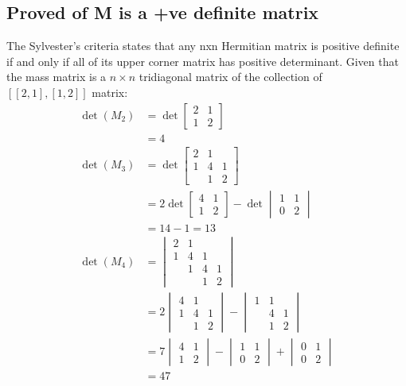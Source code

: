 \documentclass{article}
\begin{document}
\subsection{Proved of M is a +ve definite matrix}%
\label{sub:Proved of M is a +ve definite matrix}
The Sylvester's criteria states that any nxn Hermitian matrix is positive definite if and only if all of its upper corner matrix has positive determinant. Given that the mass matrix is a $n \times n$ tridiagonal matrix of the collection of $[[2, 1], [1, 2]]$ matrix:
\begin{align}
  \det(M_2) &= \det \begin{bmatrix}
    2 & 1 \\
    1 & 2
  \end{bmatrix} \\
   &= 4 \\
    \det(M_3) &= \det \begin{bmatrix}
      2 & 1 \\
      1 & 4 & 1\\
        & 1 & 2
    \end{bmatrix} \\
  &= 2 \det \begin{bmatrix}
    4 & 1 \\
    1 & 2
  \end{bmatrix} - \det \begin{vmatrix}
    1 & 1 \\ 0 & 2
  \end{vmatrix} \\
  &= 14 - 1 = 13 \\
  \det(M_4) &= \begin{vmatrix}
    2 & 1 \\ 1 & 4 & 1 \\
      & 1 & 4 & 1 \\ & & 1 & 2
  \end{vmatrix} \\
  &=  2 \begin{vmatrix}
    4 & 1 \\ 1 & 4 & 1 \\ & 1 & 2
  \end{vmatrix} - \begin{vmatrix}
    1 & 1 \\ & 4 & 1 \\ & 1 & 2
  \end{vmatrix} \\
  &= 7 \begin{vmatrix}
    4 & 1 \\ 1 & 2
  \end{vmatrix} - \begin{vmatrix}
    1 & 1 \\ 0 & 2
  \end{vmatrix} + \begin{vmatrix}
    0 & 1 \\ 0 & 2
  \end{vmatrix} \\
  &= 47 \\
\end{align}
\end{document}
